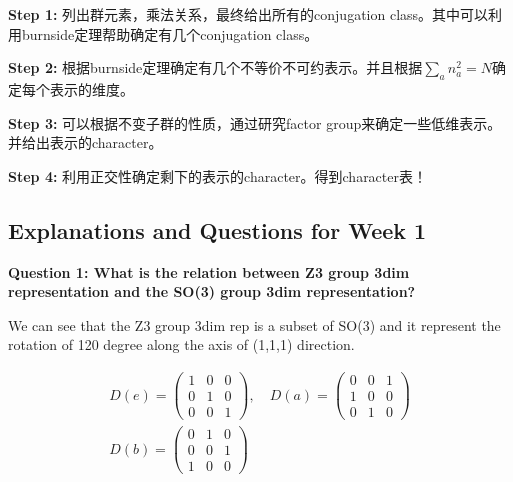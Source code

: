
\textbf{Step 1: } 列出群元素，乘法关系，最终给出所有的conjugation class。其中可以利用burnside定理帮助确定有几个conjugation class。

\textbf{Step 2: }根据burnside定理确定有几个不等价不可约表示。并且根据$ \sum_a n_a^2 = N $确定每个表示的维度。

\textbf{Step 3: }可以根据不变子群的性质，通过研究factor group来确定一些低维表示。并给出表示的character。

\textbf{Step 4: }利用正交性确定剩下的表示的character。得到character表！





\subsection{Explanations and Questions for Week 1}

\textbf{Question 1: What is the relation between Z3 group 3dim representation and the SO(3) group 3dim representation?} 

We can see that the Z3 group 3dim rep is a subset of SO(3) and it represent the rotation of 120 degree along the axis of (1,1,1) direction. 

\begin{equation}
  \begin{gathered}D(e)=\begin{pmatrix}1&0&0\\0&1&0\\0&0&1\end{pmatrix},\quad D(a)=\begin{pmatrix}0&0&1\\1&0&0\\0&1&0\end{pmatrix}\\D(b)=\begin{pmatrix}0&1&0\\0&0&1\\1&0&0\end{pmatrix}\end{gathered}
  \label{eq:z3rep3}
\end{equation}


